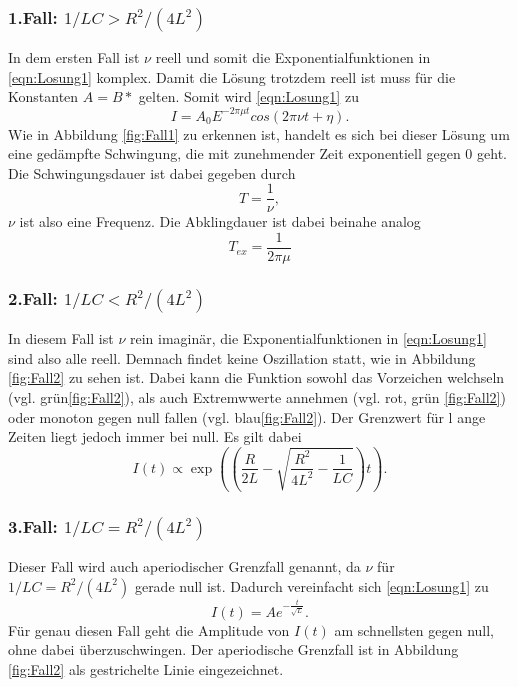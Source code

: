 \subsubsection*{1.Fall: $1/LC>R^2/(4L^2)$}
In dem ersten Fall ist $\nu$ reell und somit die Exponentialfunktionen in \eqref{eqn:Losung1} komplex. Damit die Lösung trotzdem reell ist muss
für die Konstanten $A=B*$ gelten. Somit wird \eqref{eqn:Losung1} zu
\begin{equation}
    I=A_0E^{-2\pi\mu t} cos(2\pi\nu t+\eta).
    \label{eqn:Fall1}
\end{equation}
Wie in Abbildung \ref{fig:Fall1} zu erkennen ist, handelt es sich bei dieser Lösung um eine gedämpfte Schwingung, die mit zunehmender Zeit 
exponentiell gegen 0 geht. Die Schwingungsdauer ist dabei gegeben durch
\begin{equation*}
    T=\frac{1}{\nu} ,
\end{equation*}
$\nu$ ist also eine Frequenz. Die Abklingdauer ist dabei beinahe analog
\begin{equation*}
    T_{ex}=\frac{1}{2\pi\mu}
\end{equation*}

\subsubsection*{2.Fall: $1/LC<R^2/(4L^2)$}
In diesem Fall ist $\nu$ rein imaginär, die Exponentialfunktionen in \eqref{eqn:Losung1} sind also alle reell. Demnach findet keine Oszillation
statt, wie in Abbildung \ref{fig:Fall2} zu sehen ist. Dabei kann die Funktion sowohl das Vorzeichen welchseln (vgl. grün\ref{fig:Fall2}), als
auch Extremwwerte annehmen (vgl. rot, grün \ref{fig:Fall2}) oder monoton gegen null fallen (vgl. blau\ref{fig:Fall2}). Der Grenzwert für l
ange Zeiten liegt jedoch immer bei null. Es gilt dabei
\begin{equation*}
    I(t)\propto \exp\left(\left(\frac{R}{2L}-\sqrt{\frac{R^2}{4L^2}-\frac{1}{LC}}\right)t\right)    .
\end{equation*}

\subsubsection*{3.Fall: $1/LC=R^2/(4L^2)$}
Dieser Fall wird auch aperiodischer Grenzfall genannt, da $\nu$ für $1/LC=R^2/(4L^2)$ gerade null ist. Dadurch vereinfacht sich \eqref{eqn:Losung1}
zu 
\begin{equation*}
    I(t)=Ae^{-\frac{t}{\sqrt{L}}}   .
\end{equation*}
Für genau diesen Fall geht die Amplitude von $I(t)$ am schnellsten gegen null, ohne dabei überzuschwingen. Der aperiodische Grenzfall ist in 
Abbildung \ref{fig:Fall2} als gestrichelte Linie eingezeichnet. 

